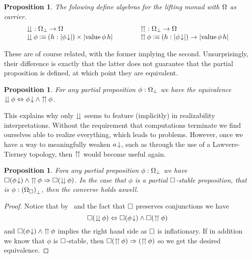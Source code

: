 \documentclass[11pt]{article}
\newtheorem{prop}[thrm]{Proposition}
\begin{document}
\begin{prop}
  The folowing define algebras for the lifting monad
  with \(\Omega\) as carrier.
  \[\arraycolsep=2em
    \begin{array}{ll}
      \ISquashSym : \IPar{\IProp} \to \IProp
      &
        \ISquishSym : \IPar{\IProp} \to \IProp
      \\
      \ISquash{\phi} \IsDefined \IProd{(h:\IHolds{\ITotal{\phi}})}{\IHolds{\IVal{\phi}\,h}}
      &
        \ISquish{\phi} \IsDefined \IFun{(h:\IHolds{\ITotal{\phi}})}{\IHolds{\IVal{\phi}\,h}}
    \end{array}
  \]
\end{prop}

These are of course related, with the former implying the second.
%
Unsurprisingly, their difference is exactly that the latter does not guarantee
that the partial proposition is defined, at which point they are equivalent.

\begin{prop}\label{prop:squash-and-squish}
  For any partial proposition \(\phi:{\Omega}_\bot\) we have the equivalence
  \({{\downdownarrows}\,{\phi}}\Leftrightarrow{{{{\phi}\!\downarrow}}\land{{\upuparrows}\,{\phi}}}\).
\end{prop}

This explains why only \({\downdownarrows}\) seems to feature (implicitly) in
realizability interpretations.
%
Without the requirement that computations terminate we find ourselves able to
realize everything, which leads to problems.
%
However, once we have a way to meaningfully weaken \({{a}\!\downarrow}\), such as
through the use of a Lawvere-Tierney topology, then \({\upuparrows}\) would become
useful again.

\begin{prop}\label{prop:boxed-squash-and-boxed-squish}
  Fora any partial proposition \(\phi : {\Omega}_\bot\) we have
  \({{\Box{({{\phi}\!\downarrow})}}\land{{\upuparrows}\,{\phi}}}\Rightarrow{\Box{({\downdownarrows}\,{\phi})}}\).
  In the case that \(\phi\) is a partial \(\Box\)-stable proposition, that
  is \(\phi : {(\Omega_\Box)}_\bot\), then the converse holds aswell.
\end{prop}
\begin{proof}
  Notice that by~ and the fact that \(\Box\)
  preserves conjunctions we have
  \[
    \IIFF%
    {\IBox{(\ISquash{\phi})}}%
    {\IAnd{\IBox{(\ITotal{\phi})}}{\IBox{(\ISquish{\phi})}}}
  \]
  and \({\Box{({{\phi}\!\downarrow})}}\land{{\upuparrows}\,{\phi}}\) implies the right hand
  side as \(\Box\) is inflationary.
  If in addition we know that \(\phi\) is \(\Box\)-stable,
  then \({\Box{({\upuparrows}\,{\phi})}}\Rightarrow{({\upuparrows}\,{\phi})}\) so
  we get the desired equivalence.
\end{proof}
\end{document}
